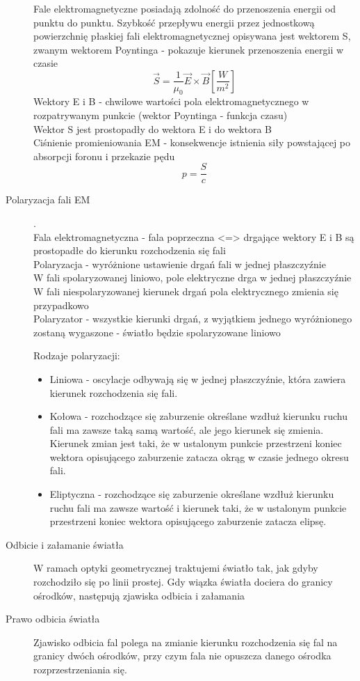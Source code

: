 \documentclass[a4paper,11pt]{article}
\begin{document}
\begin{description}
  Fale elektromagnetyczne posiadają zdolność do przenoszenia energii od punktu do punktu. Szybkość przepływu energii przez jednostkową powierzchnię płaskiej fali elektromagnetycznej opisywana jest wektorem S, zwanym wektorem Poyntinga - pokazuje kierunek przenoszenia energii w czasie
  $$\vec{S}=\frac{1}{\mu_0}\vec{E}\times\vec{B}\left[\frac{W}{m^2}\right]$$
  Wektory E i B - chwilowe wartości pola elektromagnetycznego w rozpatrywanym punkcie (wektor Poyntinga - funkcja czasu)\\
  Wektor S jest prostopadły do wektora E i do wektora B\\
  Ciśnienie promieniowania EM - konsekwencje istnienia siły powstającej po absorpcji foronu i przekazie pędu
  $$p=\frac{S}{c}$$
\item[Polaryzacja fali EM].\\
  Fala elektromagnetyczna - fala poprzeczna <=> drgające wektory E i B są prostopadłe do kierunku rozchodzenia się fali\\
  Polaryzacja - wyróżnione ustawienie drgań fali w jednej płaszczyźnie\\
  W fali spolaryzowanej liniowo, pole elektryczne drga w jednej płaszczyźnie\\
  W fali niespolaryzowanej kierunek drgań pola elektrycznego zmienia się przypadkowo\\
  Polaryzator - wszystkie kierunki drgań, z wyjątkiem jednego wyróżnionego zostaną wygaszone - światło będzie spolaryzowane liniowo

  Rodzaje polaryzacji:
  \begin{itemize}
  \item Liniowa - oscylacje odbywają się w jednej płaszczyźnie, która zawiera kierunek rozchodzenia się fali.
  \item Kołowa - rozchodzące się zaburzenie określane wzdłuż kierunku ruchu fali ma zawsze taką samą wartość, ale jego kierunek się zmienia. Kierunek zmian jest taki, że w ustalonym punkcie przestrzeni koniec wektora opisującego zaburzenie zatacza okrąg w czasie jednego okresu fali.
  \item Eliptyczna - rozchodzące się zaburzenie określane wzdłuż kierunku ruchu fali ma zawsze wartość i kierunek taki, że w ustalonym punkcie przestrzeni koniec wektora opisującego zaburzenie zatacza elipsę.
  \end{itemize}
\item[Odbicie i załamanie światła]
  W ramach optyki geometrycznej traktujemi światło tak, jak gdyby rozchodziło się po linii prostej. Gdy wiązka światła dociera do granicy ośrodków, następują zjawiska odbicia i załamania
\item[Prawo odbicia światła]
  Zjawisko odbicia fal polega na zmianie kierunku rozchodzenia się fal na granicy dwóch ośrodków, przy czym fala nie opuszcza danego ośrodka rozprzestrzeniania się.


\end{description}
\end{document}
